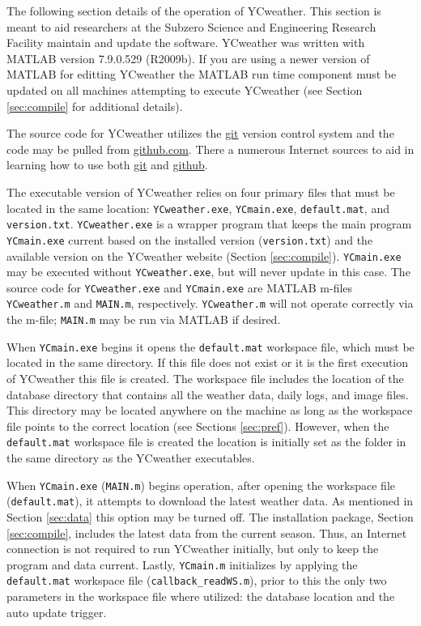  \label{sec:advanced}
The following section details of the operation of YCweather.  This section is meant to aid researchers at the Subzero Science and Engineering Research Facility maintain and update the software.  YCweather was written with MATLAB version 7.9.0.529 (R2009b).  If you are using a newer version of MATLAB for editting YCweather the MATLAB run time component must be updated on all machines attempting to execute YCweather (see Section \ref{sec:compile} for additional details).

The source code for YCweather utilizes the \href{http://git-scm.com/}{git} version control system and the code may be pulled from \href{https://github.com/aeslaughter/YCweather}{github.com}. There a numerous Internet sources to aid in learning how to use both \href{http://git-scm.com/}{git} and \href{https://github.com/}{github}.

The executable version of YCweather relies on four primary files that must be located in the same location: \texttt{YCweather.exe}, \texttt{YCmain.exe}, \texttt{default.mat}, and \texttt{version.txt}.  \texttt{YCweather.exe} is a wrapper program that keeps the main program \texttt{YCmain.exe} current based on the installed version (\texttt{version.txt}) and the available version on the YCweather website (Section \ref{sec:compile}).  \texttt{YCmain.exe} may be executed without \texttt{YCweather.exe}, but will never update in this case.  The source code for \texttt{YCweather.exe} and \texttt{YCmain.exe} are MATLAB m-files \texttt{YCweather.m} and \texttt{MAIN.m}, respectively.  \texttt{YCweather.m} will not operate correctly via the m-file; \texttt{MAIN.m} may be run via MATLAB if desired.

When \texttt{YCmain.exe} begins it opens the \texttt{default.mat} workspace file, which must be located in the same directory.  If this file does not exist or it is the first execution of YCweather this file is created.  The workspace file includes the location of the database directory that contains all the weather data, daily logs, and image files.  This directory may be located anywhere on the machine as long as the workspace file points to the correct location (see Sections \ref{sec:pref}).  However, when the \texttt{default.mat} workspace file is created the location is initially set as the  folder in the same directory as the YCweather executables.

When \texttt{YCmain.exe} (\texttt{MAIN.m}) begins operation, after opening the workspace file (\texttt{default.mat}), it attempts to download the latest weather data.  As mentioned in Section \ref{sec:data} this option may be turned off.  The installation package, Section \ref{sec:compile}, includes the latest data from the current season.  Thus, an Internet connection is not required to run YCweather initially, but only to keep the program and data current.  Lastly, \texttt{YCmain.m} initializes by applying the \texttt{default.mat} workspace file (\texttt{callback\_readWS.m}), prior to this the only two parameters in the workspace file where utilized: the database location and the auto update trigger.

